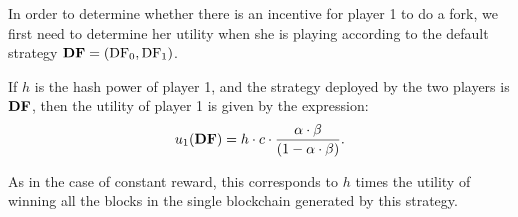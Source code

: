 In order to determine whether there is an incentive for player 1 to do a fork, we first need to determine her utility when she is playing according to the default strategy $\text{\rm {\bf DF}} = (\text{\rm DF}_0,\text{\rm DF}_1)$. 

\begin{lemma}\label{lem:default_utility}
If $h$ is the hash power of player 1, and the strategy deployed by the two players is $\text{\rm {\bf DF}}$, then the utility of player 1 is given by the expression:
$$u_1(\text{\rm {\bf DF}}) = h\cdot c\cdot\frac{\alpha\cdot\beta}{(1-\alpha\cdot\beta)}.$$
\end{lemma}
As in the case of constant reward, this corresponds to $h$ times the utility of winning all the blocks in the single blockchain generated by this strategy.


